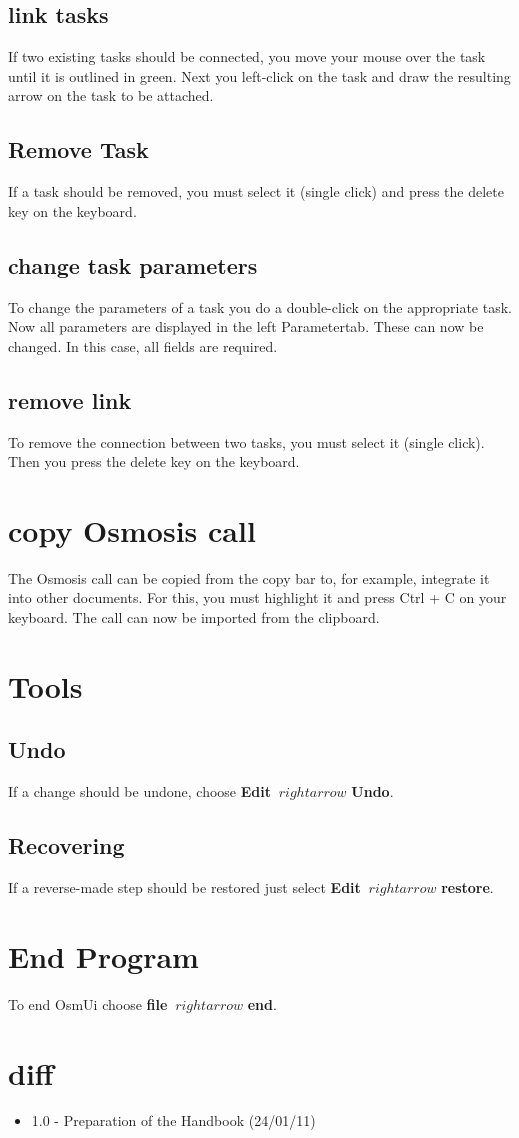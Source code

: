 \documentclass[a4paper,10pt]{scrartcl}
\begin{document}
\subsection {link tasks}
If two existing tasks should be connected, you move your mouse over the task until it is outlined in green. Next you left-click on the task and draw the resulting arrow on the task to be attached.
\subsection {Remove Task}
If a task should be removed, you must select it (single click) and press the delete key on the keyboard.
\subsection {change task parameters}
To change the parameters of a task you do a double-click on the appropriate task. Now all parameters are displayed in the left Parametertab. These can now be changed. In this case, all fields are required.
\subsection {remove link}
To remove the connection between two tasks, you must select it (single click). Then you press the delete key on the keyboard.

\section {copy Osmosis call}
The Osmosis call can be copied from the copy bar to, for example, integrate it into other documents. For this, you must highlight it and press Ctrl + C on your keyboard. The call can now be imported from the clipboard.

\section {Tools}
\subsection {Undo}
If a change should be undone, choose \textbf {Edit} $ \ rightarrow $ \textbf {Undo}.
\subsection {Recovering}
If a reverse-made step should be restored just select \textbf {Edit} $ \ rightarrow $ \textbf {restore}.

\section {End Program}
To end OsmUi choose \textbf {file} $ \ rightarrow $ \textbf {end}.

\section {diff}
\begin {itemize}
\item 1.0 - Preparation of the Handbook (24/01/11)
\end {itemize}
\end{document}
